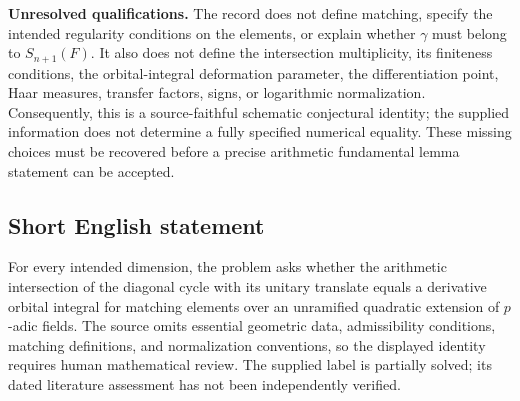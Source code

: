 \documentclass[11pt]{article}
\begin{document}
\textbf{Unresolved qualifications.} The record does not define matching, specify the intended regularity conditions on the elements, or explain whether \(\gamma\) must belong to \(S_{n+1}(F)\). It also does not define the intersection multiplicity, its finiteness conditions, the orbital-integral deformation parameter, the differentiation point, Haar measures, transfer factors, signs, or logarithmic normalization. Consequently, this is a source-faithful schematic conjectural identity; the supplied information does not determine a fully specified numerical equality. These missing choices must be recovered before a precise arithmetic fundamental lemma statement can be accepted.
\subsection{Short English statement}
For every intended dimension, the problem asks whether the arithmetic intersection of the diagonal cycle with its unitary translate equals a derivative orbital integral for matching elements over an unramified quadratic extension of \(p\)-adic fields. The source omits essential geometric data, admissibility conditions, matching definitions, and normalization conventions, so the displayed identity requires human mathematical review. The supplied label is partially solved; its dated literature assessment has not been independently verified.
\end{document}
